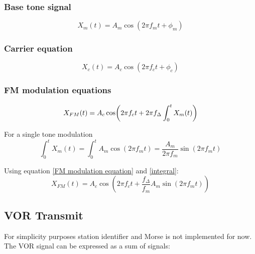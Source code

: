 \documentclass[12pt]{article}
\begin{document}
\subsubsection{Base tone signal}
\begin{equation}
\label{Base tone equation fm}
X_{m}(t) = A_m \cos (2\pi f_m t + \phi_m)
\end{equation}

\subsubsection{Carrier equation}
\begin{equation}
\label{Carrier equation fm}
X_{c}(t) = A_c \cos (2\pi f_c t + \phi_c)
\end{equation}

\subsubsection{FM modulation equations}
\begin{equation}
\label{FM modulation equation}
X_{FM}(t) = A_c\cos(2\pi f_c t + 2\pi f_\Delta\\ \int_{0}^{t} X_m(t) )
\end{equation}

For a single tone modulation
\begin{equation}
\label{integral}
\int_{0}^{t} X_m(t) = \int_{0}^{t} A_m \cos (2\pi f_m t) = \frac{A_m}{2 \pi f_m} \sin(2 \pi f_m t)
\end{equation}

Using equation \eqref{FM modulation equation} and \eqref{integral}:
\begin{equation}
\label{final_fm_equation}
X_{FM}(t) = A_c\cos(2\pi f_c t + \frac{f_\Delta}{f_m}A_m \sin(2 \pi f_m t))
\end{equation}

\newpage
\subsection{VOR Transmit}%
For simplicity purposes station identifier and Morse is not implemented for now. 
The VOR signal can be expressed as a sum of signals:
\end{document}
